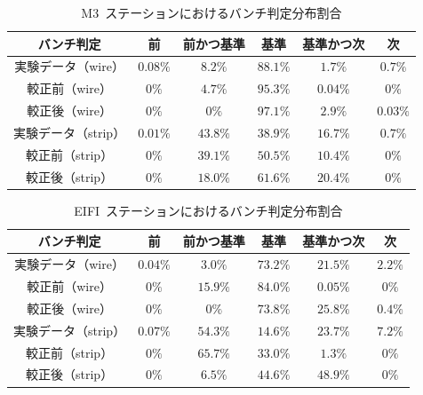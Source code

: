 \begin{table}[htb]
	\centering
	\begin{tabular}{c|c|c|c|c|c}\hline
	バンチ判定&前&前かつ基準&基準&基準かつ次&次 \\ \hline\hline
	実験データ（wire）& $0.08\%$ & $8.2\%$ & $88.1\%$ & $1.7\%$ & $0.7\%$ \\
	較正前（wire）& $0\%$ & $4.7\%$ & $95.3\%$ & $0.04\%$ & $0\%$ \\ 
	較正後（wire）& $0\%$ & $0\%$ & $97.1\%$ & $2.9\%$ & $0.03\%$ \\ \hline
	実験データ（strip）& $0.01\%$ & $43.8\%$ & $38.9\%$ & $16.7\%$ & $0.7\%$ \\
	較正前（strip）& $0\%$ & $39.1\%$ & $50.5\%$ & $10.4\%$ & $0\%$ \\
	較正後（strip）& $0\%$ & $18.0\%$ & $61.6\%$ & $20.4\%$ & $0\%$ \\
	\end{tabular}
	\caption{M3~ステーションにおけるバンチ判定分布割合}\label{tb:tunebcidM3}
\end{table}

\begin{table}[htb]
	\centering
	\begin{tabular}{c|c|c|c|c|c}\hline
	バンチ判定&前&前かつ基準&基準&基準かつ次&次 \\ \hline\hline
	実験データ（wire）& $0.04\%$ & $3.0\%$ & $73.2\%$ & $21.5\%$ & $2.2\%$ \\
	較正前（wire）& $0\%$ & $15.9\%$ & $84.0\%$ & $0.05\%$ & $0\%$ \\ 
	較正後（wire）& $0\%$ & $0\%$ & $73.8\%$ & $25.8\%$ & $0.4\%$ \\ \hline
	実験データ（strip）& $0.07\%$ & $54.3\%$ & $14.6\%$ & $23.7\%$ & $7.2\%$ \\
	較正前（strip）& $0\%$ & $65.7\%$ & $33.0\%$ & $1.3\%$ & $0\%$ \\
	較正後（strip）& $0\%$ & $6.5\%$ & $44.6\%$ & $48.9\%$ & $0\%$ \\
	\end{tabular}
	\caption{EIFI~ステーションにおけるバンチ判定分布割合}\label{tb:tunebcidEIFI}
\end{table}

